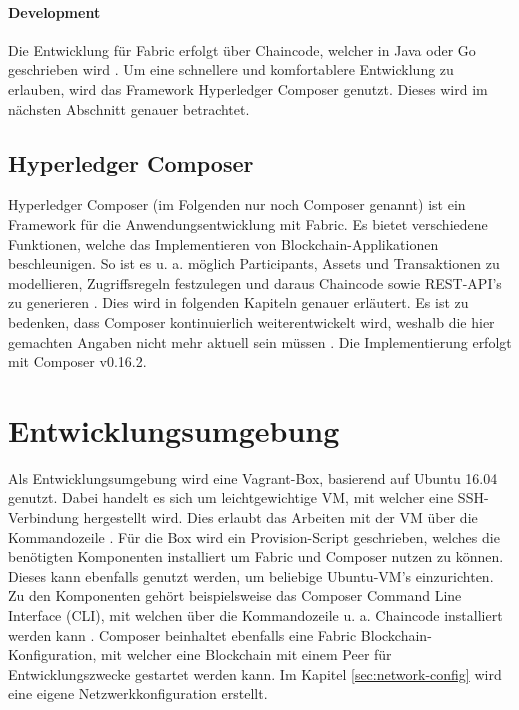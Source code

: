 \paragraph{Development}
Die Entwicklung für Fabric erfolgt über Chaincode, welcher in Java oder Go geschrieben wird \cite{HyperledgerFabricTeamSDKsHyperledgerFabric}. Um eine schnellere und komfortablere Entwicklung zu erlauben, wird das Framework Hyperledger Composer genutzt. Dieses wird im nächsten Abschnitt genauer betrachtet.


\subsection{Hyperledger Composer}
Hyperledger Composer (im Folgenden nur noch Composer genannt) ist ein Framework für die Anwendungsentwicklung mit Fabric. Es bietet verschiedene Funktionen, welche das Implementieren von Blockchain-Applikationen beschleunigen. So ist es u. a. möglich Participants, Assets und Transaktionen zu modellieren, Zugriffsregeln festzulegen und daraus Chaincode sowie REST-API's zu generieren \cite{HyperledgerComposerTeamIntroductionHyperledgerComposer}. Dies wird in folgenden Kapiteln genauer erläutert. Es ist zu bedenken, dass Composer kontinuierlich weiterentwickelt wird, weshalb die hier gemachten Angaben nicht mehr aktuell sein müssen \cite{HyperledgerComposerTeamHyperledgerComposerReleases2018}. Die Implementierung erfolgt mit Composer v0.16.2.

\section{Entwicklungsumgebung}
Als Entwicklungsumgebung wird eine Vagrant-Box, basierend auf Ubuntu 16.04 genutzt. Dabei handelt es sich um leichtgewichtige VM, mit welcher eine SSH-Verbindung hergestellt wird. Dies erlaubt das Arbeiten mit der VM über die Kommandozeile \cite{VagrantTeamVagrantHashiCorp}. Für die Box wird ein Provision-Script geschrieben, welches die benötigten Komponenten installiert um Fabric und Composer nutzen zu können. Dieses kann ebenfalls genutzt werden, um beliebige Ubuntu-VM's einzurichten. Zu den Komponenten gehört beispielsweise das Composer Command Line Interface (CLI), mit welchen über die Kommandozeile u. a. Chaincode installiert werden kann \cite{HyperledgerComposerTeamDevelopmentEnvironmentHyperledger}. Composer beinhaltet ebenfalls eine Fabric Blockchain-Konfiguration, mit welcher eine Blockchain mit einem Peer für Entwicklungszwecke gestartet werden kann. Im Kapitel \ref{sec:network-config} wird eine eigene Netzwerkkonfiguration erstellt.


